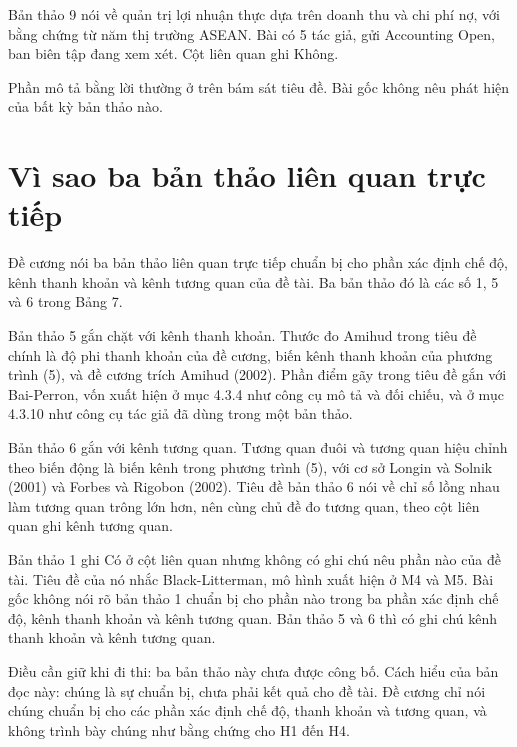 Bản thảo 9 nói về quản trị lợi nhuận thực dựa trên doanh thu và chi phí nợ, với bằng chứng từ năm thị trường ASEAN. Bài có 5 tác giả, gửi Accounting Open, ban biên tập đang xem xét. Cột liên quan ghi Không.

Phần mô tả bằng lời thường ở trên bám sát tiêu đề. Bài gốc không nêu phát hiện của bất kỳ bản thảo nào.

\section{Vì sao ba bản thảo liên quan trực tiếp}

Đề cương nói ba bản thảo liên quan trực tiếp chuẩn bị cho phần xác định chế độ, kênh thanh khoản và kênh tương quan của đề tài. Ba bản thảo đó là các số 1, 5 và 6 trong Bảng 7.

Bản thảo 5 gắn chặt với kênh thanh khoản. Thước đo Amihud trong tiêu đề chính là độ phi thanh khoản của đề cương, biến kênh thanh khoản của phương trình (5), và đề cương trích Amihud (2002). Phần điểm gãy trong tiêu đề gắn với Bai-Perron, vốn xuất hiện ở mục 4.3.4 như công cụ mô tả và đối chiếu, và ở mục 4.3.10 như công cụ tác giả đã dùng trong một bản thảo.

Bản thảo 6 gắn với kênh tương quan. Tương quan đuôi và tương quan hiệu chỉnh theo biến động là biến kênh trong phương trình (5), với cơ sở Longin và Solnik (2001) và Forbes và Rigobon (2002). Tiêu đề bản thảo 6 nói về chỉ số lồng nhau làm tương quan trông lớn hơn, nên cùng chủ đề đo tương quan, theo cột liên quan ghi kênh tương quan.

Bản thảo 1 ghi Có ở cột liên quan nhưng không có ghi chú nêu phần nào của đề tài. Tiêu đề của nó nhắc Black-Litterman, mô hình xuất hiện ở M4 và M5. Bài gốc không nói rõ bản thảo 1 chuẩn bị cho phần nào trong ba phần xác định chế độ, kênh thanh khoản và kênh tương quan. Bản thảo 5 và 6 thì có ghi chú kênh thanh khoản và kênh tương quan.

Điều cần giữ khi đi thi: ba bản thảo này chưa được công bố. Cách hiểu của bản đọc này: chúng là sự chuẩn bị, chưa phải kết quả cho đề tài. Đề cương chỉ nói chúng chuẩn bị cho các phần xác định chế độ, thanh khoản và tương quan, và không trình bày chúng như bằng chứng cho H1 đến H4.

